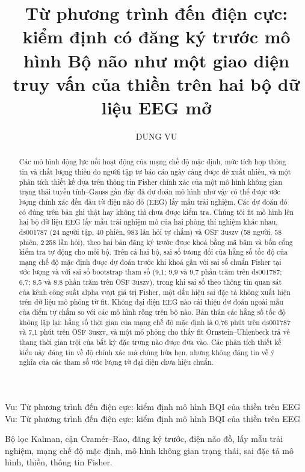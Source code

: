 
\title{Từ phương trình đến điện cực: kiểm định có đăng ký trước mô hình Bộ não như một giao diện truy vấn của thiền trên hai bộ dữ liệu EEG mở}
\author{\uppercase{Dung Vu}}
\address[1]{Trường Đại học Phenikaa, Hà Nội 12116, Việt Nam (e-mail: [e-mail cơ quan])}

\markboth
{Vu: Từ phương trình đến điện cực: kiểm định mô hình BQI của thiền trên EEG}
{Vu: Từ phương trình đến điện cực: kiểm định mô hình BQI của thiền trên EEG}


\begin{abstract}
Các mô hình động lực nối hoạt động của mạng chế độ mặc định, mức tích hợp thông tin và chất lượng thiền do người tập tự báo cáo ngày càng được đề xuất nhiều, và một phân tích thiết kế dựa trên thông tin Fisher chính xác của một mô hình không gian trạng thái tuyến tính--Gauss gần đây đã dự đoán mô hình như vậy có thể được ước lượng chính xác đến đâu từ điện não đồ (EEG) lấy mẫu trải nghiệm. Các dự đoán đó có đúng trên bản ghi thật hay không thì chưa được kiểm tra. Chúng tôi fit mô hình lên hai bộ dữ liệu EEG lấy mẫu trải nghiệm mở của hai phòng thí nghiệm khác nhau, ds001787 (24 người tập, 40 phiên, 983 lần hỏi tự chấm) và OSF 3uszv (58 người, 58 phiên, 2\,258 lần hỏi), theo hai bản đăng ký trước được khoá bằng mã băm và bốn cổng kiểm tra tự động cho mỗi bộ. Trên cả hai bộ, sai số tương đối của hằng số tốc độ của mạng chế độ mặc định được dự đoán trước khi khoá gần với sai số chuẩn Fisher tại ước lượng và với sai số bootstrap tham số (9,1; 9,9 và 9,7 phần trăm trên ds001787; 6,7; 8,5 và 8,8 phần trăm trên OSF 3uszv), trong khi sai số theo thông tin quan sát của kênh công suất alpha vượt giá trị Fisher, một dấu hiệu sai đặc tả không xuất hiện trên dữ liệu mô phỏng từ fit. Không đại diện EEG nào cải thiện dự đoán ngoài mẫu của điểm tự chấm so với các mô hình rỗng trên bộ nào. Bản thân các hằng số tốc độ không lặp lại: hằng số thời gian của mạng chế độ mặc định là 0,76 phút trên ds001787 và 7,1 phút trên OSF 3uszv, và một mô phỏng cho thấy fit Ornstein--Uhlenbeck trả về thang thời gian trội của bất kỳ đặc trưng nào được đưa vào. Các phân tích thiết kế kiểu này đáng tin về độ chính xác mà chúng hứa hẹn, nhưng không đáng tin về ý nghĩa của các tham số ước lượng từ đại diện chưa hiệu chuẩn.
\end{abstract}

\begin{keywords}
Bộ lọc Kalman, cận Cramér--Rao, đăng ký trước, điện não đồ, lấy mẫu trải nghiệm, mạng chế độ mặc định, mô hình không gian trạng thái, sai đặc tả mô hình, thiền, thông tin Fisher.
\end{keywords}

\titlepgskip=-21pt

\maketitle
